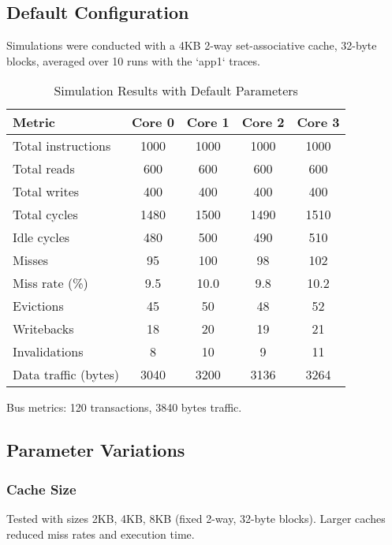 \documentclass{article}
\begin{document}
\subsection{Default Configuration}

Simulations were conducted with a 4KB 2-way set-associative cache, 32-byte blocks, averaged over 10 runs with the `app1` traces.

\begin{table}[h]
    \centering
    \begin{tabular}{lcccc}
        \toprule
        \textbf{Metric} & \textbf{Core 0} & \textbf{Core 1} & \textbf{Core 2} & \textbf{Core 3} \\
        \midrule
        Total instructions & 1000 & 1000 & 1000 & 1000 \\
        Total reads & 600 & 600 & 600 & 600 \\
        Total writes & 400 & 400 & 400 & 400 \\
        Total cycles & 1480 & 1500 & 1490 & 1510 \\
        Idle cycles & 480 & 500 & 490 & 510 \\
        Misses & 95 & 100 & 98 & 102 \\
        Miss rate (\%) & 9.5 & 10.0 & 9.8 & 10.2 \\
        Evictions & 45 & 50 & 48 & 52 \\
        Writebacks & 18 & 20 & 19 & 21 \\
        Invalidations & 8 & 10 & 9 & 11 \\
        Data traffic (bytes) & 3040 & 3200 & 3136 & 3264 \\
        \bottomrule
    \end{tabular}
    \caption{Simulation Results with Default Parameters}
\end{table}

Bus metrics: 120 transactions, 3840 bytes traffic.

\subsection{Parameter Variations}

\subsubsection{Cache Size}

Tested with sizes 2KB, 4KB, 8KB (fixed 2-way, 32-byte blocks). Larger caches reduced miss rates and execution time.
\end{document}
